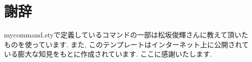 \documentclass[11pt,a4paper,oneside,lualatex]{ltjsarticle} %
\begin{document}

\section*{謝辞}


mycommand.styで定義しているコマンドの一部は松坂俊輝さんに教えて頂いたものを使っています.
また, このテンプレートはインターネット上に公開されている膨大な知見をもとに作成されています.
ここに感謝いたします.




\end{document}
